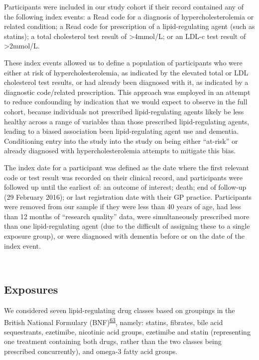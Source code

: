 \documentclass[a4paper, twoside]{templates/ociamthesis}
\begin{document}
Participants were included in our study cohort if their record contained any of the following index events: a Read code for a diagnosis of hypercholesterolemia or related condition; a Read code for prescription of a lipid-regulating agent (such as statins); a total cholesterol test result of \textgreater4mmol/L; or an LDL-c test result of \textgreater2mmol/L.

These index events allowed us to define a population of participants who were either at risk of hypercholesterolemia, as indicated by the elevated total or LDL cholesterol test results, or had already been diagnosed with it, as indicated by a diagnostic code/related prescription. This approach was employed in an attempt to reduce confounding by indication that we would expect to observe in the full cohort, because individuals not prescribed lipid-regulating agents likely be less healthy across a range of variables than those prescribed lipid-regulating agents, leading to a biased association been lipid-regulating agent use and dementia. Conditioning entry into the study into the study on being either ``at-risk'' or already diagnosed with hypercholesterolemia attempts to mitigate this bias.

The index date for a participant was defined as the date where the first relevant code or test result was recorded on their clinical record, and participants were followed up until the earliest of: an outcome of interest; death; end of follow-up (29 February 2016); or last registration date with their GP practice. Participants were removed from our sample if they were less than 40 years of age, had less than 12 months of ``research quality'' data, were simultaneously prescribed more than one lipid-regulating agent (due to the difficult of assigning these to a single exposure group), or were diagnosed with dementia before or on the date of the index event.

~

\hypertarget{exposures}{%
\subsection{Exposures}\label{exposures}}

We considered seven lipid-regulating drug classes based on groupings in the British National Formulary (BNF)\textsuperscript{\protect\hyperlink{ref-wishart2017}{63}}, namely: statins, fibrates, bile acid sequestrants, ezetimibe, nicotinic acid groups, ezetimibe and statin (representing one treatment containing both drugs, rather than the two classes being prescribed concurrently), and omega-3 fatty acid groups.
\end{document}
